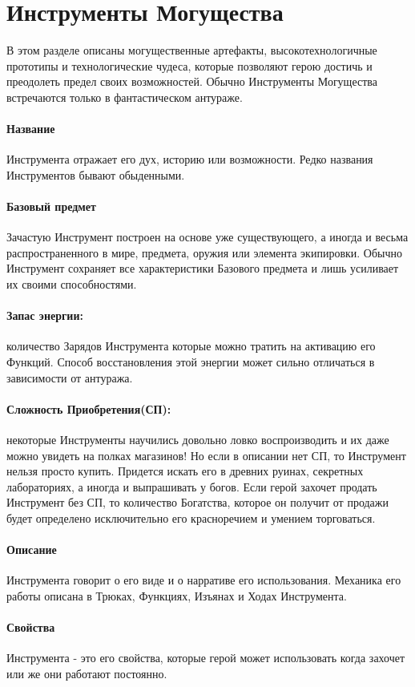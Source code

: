 \section{Инструменты Могущества}
В этом разделе описаны могущественные артефакты, высокотехнологичные прототипы и технологические чудеса, которые позволяют герою достичь и преодолеть предел своих возможностей. Обычно Инструменты Могущества встречаются только в фантастическом антураже.

\paragraph{Название} Инструмента отражает его дух, историю или возможности. Редко названия Инструментов бывают обыденными.
\paragraph{Базовый предмет} Зачастую Инструмент построен на основе уже существующего, а иногда и весьма распространенного в мире, предмета, оружия или элемента экипировки. Обычно Инструмент сохраняет все характеристики Базового предмета и лишь усиливает их своими способностями.
\paragraph{Запас энергии: } количество Зарядов Инструмента которые можно тратить на активацию его Функций. Способ восстановления этой энергии может сильно отличаться в зависимости от антуража.
\paragraph{Сложность Приобретения(СП): }некоторые Инструменты научились довольно ловко воспроизводить и их даже можно увидеть на полках магазинов! Но если в описании нет СП, то Инструмент нельзя просто купить. Придется искать его в древних руинах, секретных лабораториях, а иногда и выпрашивать у богов. Если герой захочет продать Инструмент без СП, то количество Богатства, которое он получит от продажи будет определено исключительно его красноречием и умением торговаться.
\paragraph{Описание }Инструмента говорит о его виде и о нарративе его использования. Механика его работы описана в Трюках, Функциях, Изъянах и Ходах Инструмента.
\paragraph{Свойства }Инструмента - это его свойства, которые герой может использовать когда захочет или же они работают постоянно.
